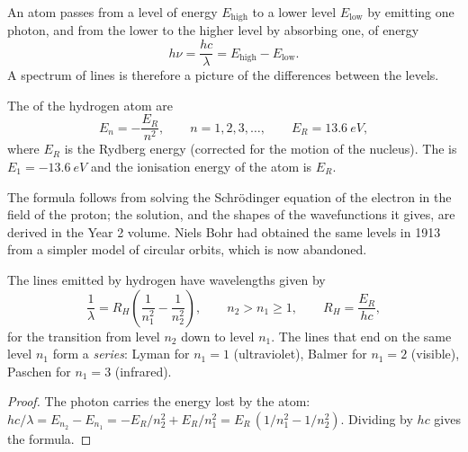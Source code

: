 An atom passes from a level of energy $E_{\text{high}}$ to a lower level
$E_{\text{low}}$ by emitting one photon, and from the lower to the higher
level by absorbing one, of energy
\[
  h\nu = \frac{hc}{\lambda} = E_{\text{high}} - E_{\text{low}} .
\]
A spectrum of lines is therefore a picture of the differences between
the levels.

\begin{theorem}\label{thm:b1:quantum-numbers:levels}
The  of the hydrogen atom are
\[
  E_n = -\frac{E_R}{n^2}, \qquad n = 1, 2, 3, \dots,
  \qquad E_R = \qty{13.6}{eV},
\]
where $E_R$ is the Rydberg energy (corrected for the motion of the
nucleus). The  is $E_1 = \qty{-13.6}{eV}$ and the ionisation
energy of the atom is $E_R$.
\end{theorem}
\admitted

\begin{remark}\label{rem:b1:quantum-numbers:schrodinger}
The formula follows from solving the Schrödinger equation of the electron
in the field of the proton; the solution, and the shapes of the
wavefunctions it gives, are derived in the Year 2 volume. Niels Bohr had
obtained the same levels in 1913 from a simpler model of circular orbits,
which is now abandoned.
\end{remark}

\begin{proposition}\label{prop:b1:quantum-numbers:rydberg}
The lines emitted by hydrogen have wavelengths given by
\[
  \frac{1}{\lambda} = R_H\left(\frac{1}{n_1^2} - \frac{1}{n_2^2}\right),
  \qquad n_2 > n_1 \ge 1, \qquad R_H = \frac{E_R}{hc},
\]
for the transition from level $n_2$ down to level $n_1$. The lines that
end on the same level $n_1$ form a \emph{series}: Lyman for $n_1 = 1$
(ultraviolet), Balmer for $n_1 = 2$ (visible), Paschen for $n_1 = 3$
(infrared).
\end{proposition}

\begin{proof}
The photon carries the energy lost by the atom:
$hc/\lambda = E_{n_2} - E_{n_1} = -E_R/n_2^2 + E_R/n_1^2
= E_R\,(1/n_1^2 - 1/n_2^2)$. Dividing by $hc$ gives the formula.
\end{proof}

